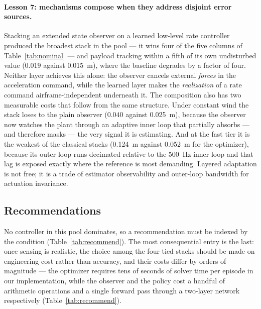 \paragraph{Lesson 7: mechanisms compose when they address disjoint error sources.}
Stacking an extended state observer on a learned low-level rate controller produced the
broadest stack in the pool --- it wins four of the five columns of
Table~\ref{tab:nominal} --- and payload tracking within a fifth of its own undisturbed
value ($0.019$ against \SI{0.015}{\meter}), where the baseline degrades by a factor of
four. Neither layer achieves this alone: the observer cancels external \emph{forces} in
the acceleration command, while the learned layer makes the \emph{realization} of a rate
command airframe-independent underneath it. The composition also has two measurable costs
that follow from the same structure. Under constant wind the stack loses to the plain
observer ($0.040$ against \SI{0.025}{\meter}), because the observer now watches the plant
through an adaptive inner loop that partially absorbs --- and therefore masks --- the very
signal it is estimating. And at the fast tier it is the weakest of the classical stacks
(\SI{0.124}{\meter} against \SI{0.052}{\meter} for the optimizer), because its outer loop
runs decimated relative to the \SI{500}{\hertz} inner loop and that lag is exposed exactly
where the reference is most demanding. Layered adaptation is not free; it is a trade of
estimator observability and outer-loop bandwidth for actuation invariance.

\subsection{Recommendations}
\label{sec:results:recommendations}

No controller in this pool dominates, so a recommendation must be indexed by the
condition (Table~\ref{tab:recommend}). The most consequential entry is the last: once
sensing is realistic, the choice among the four tied stacks should be made on
engineering cost rather than accuracy, and their costs differ by orders of magnitude ---
the optimizer requires tens of seconds of solver time per episode in our implementation,
while the observer and the policy cost a handful of arithmetic operations and a single
forward pass through a two-layer network respectively (Table~\ref{tab:recommend}).

